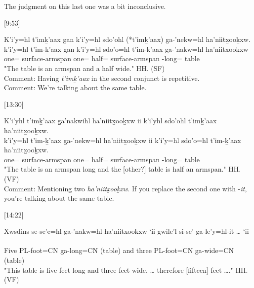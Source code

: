 \begin{exe}
\end{exe}

The judgment on this last one was a bit inconclusive.

[9:53]
\begin{exe}
    \ex \glll
    K’i’y=hl t’imḵ’aax g̱an k’i’y=hl sdo’ohl (*t’imḵ’aax) g̱a-’nekw=hl ha’niitx̱ooḵxw. \\
    k’i’y=hl t’im-ḵ’aax g̱an k’i’y=hl sdo’o=hl t’im-ḵ’aax g̱a-’nakw=hl ha’niitx̱ooḵxw \\
    one=\Cn{} surface-armspan \Pcnj{} one=\Cn{} half=\Cn{} surface-armspan \Dist-long=\Cn{} table \\
    \glt "The table is an armspan and a half wide." \hfill HH.\ElicitationDate{} (SF) \\
    Comment: Having \textit{t’imḵ’aax} in the second conjunct is repetitive. \\
    Comment: We're talking about the same table.
\end{exe}

[13:30]
\begin{exe}
    \ex \glll
    K’i’yhl t’imḵ’aax g̱a’nakwihl ha’niitx̱ooḵxw ii k’i’yhl sdo’ohl t’imḵ’aax ha’niitx̱ooḵxw. \\
    k’i’y=hl t’im-ḵ’aax g̱a-’nekw=hl ha’niitx̱ooḵxw ii k’i’y=hl sdo’o=hl t’im-ḵ’aax ha’niitx̱ooḵxw. \\
    one=\Cn{} surface-armspan \Pcnj{} one=\Cn{} half=\Cn{} surface-armspan \Dist-long=\Cn{} table \\
    \glt "The table is an armspan long and the [other?] table is half an armspan." \hfill HH.\ElicitationDate{} (VF) \\
    Comment: Mentioning two \textit{ha’niitx̱ooḵxw}. If you replace the second one with -\textit{it}, you're talking about the same table.
\end{exe}

[14:22]
\begin{exe}
    \ex \glll
    Xwsdins se-se’e=hl g̱a-’nakw=hl ha’niitx̱ooḵxw ‘ii gwile’l si-se’   g̱a-le’y=hl-it … ‘ii  \\ 
    \\ 
    Five 	 PL-foot=CN g̱a-long=CN (table)	    and three PL-foot=CN g̱a-wide=CN (table) \\
    \glt "This table is five feet long and three feet wide. … therefore [fifteen] feet …." \hfill HH.\ElicitationDate{} (VF)
\end{exe}

